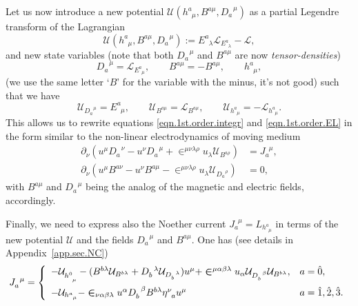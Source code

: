 \documentclass[
10pt, %
a4paper, %
oneside, %
headinclude,footinclude, %
BCOR5mm, %
]{scrartcl}
\newcommand{\tetrsymbol}{h}
\newcommand{\itetrsymbol}{\eta}
\newcommand{\itetr}[2]{\itetrsymbol^{#1}_{\phantom{#1}#2}}
\newcommand{\tetr}[2]{\tetrsymbol^{#1}_{\phantom{#1}#2}}
\newcommand{\D}[1]{\partial_{#1}} %
\newcommand{\ET}[2]{E^{#1}_{\phantom{#1}#2}}	%
\newcommand{\dT}[2]{D_{#1}^{\phantom{#1}\,#2}}	%
\newcommand{\BT}[2]{B^{#1#2}}	%
\newcommand{\bT}[2]{B^{#1#2}}	%
\newcommand{\Laghodge}{L}%
\newcommand{\LagBE}{\mathcal{L}}%
\newcommand{\LagST}{\mathcal{U}}%
\newcommand{\LCsymb}{\bm{\in}}    %
\newcommand{\NC}[2]{J^{\phantom{#1}#2}_{#1}}
\newcommand{\indalg}[1]{\hat{\mathsmaller{#1}}}
\begin{document}
Let us now introduce a new potential $ \LagST(\tetr{a}{\mu},\bT{a}{\mu},\dT{a}{\mu}) $ as a partial 
Legendre transform of the Lagrangian
\begin{equation}\label{eqn.Legandre1}
 \LagST(\tetr{a}{\mu},\bT{a}{\mu},\dT{a}{\mu}) := \ET{a}{\lambda}\LagBE_{\ET{a}{\lambda}} - \LagBE,
\end{equation}
and new state variables (note that both $ \dT{a}{\mu} $ and $ \bT{a}{\mu} $ are now 
\emph{tensor-densities})
\begin{equation}\label{eqn.Legandre2}
\dT{a}{\mu} = \LagBE_{\ET{a}{\mu}}, \qquad \bT{a}{\mu} = -\BT{a}{\mu}, \qquad 
\tetr{a}{\mu},
\end{equation}
({\color{blue}we use the same letter `$ B $' for the variable with the minus, it's not good})
such that we have
\begin{equation}\label{eqn.Legandre3}
\LagST_{\dT{a}{\mu}} = \ET{a}{\mu}, \qquad \LagST_{\bT{a}{\mu}} = \LagBE_{\BT{a}{\mu}},
\qquad \LagST_{\tetr{a}{\mu}} = - \LagBE_{\tetr{a}{\mu}}.
\end{equation}
This allows us to rewrite equations \eqref{eqn.1st.order.integr} and \eqref{eqn.1st.order.EL} in 
the form similar to the non-linear 
electrodynamics of moving medium~\cite{Obukhov2008,DPRZ2017,Hohmann2018a}
\begin{subequations}
	\begin{align}
		\D{\nu}(u^\mu\dT{a}{\nu} - u^\nu \dT{a}{\mu} + 
		\LCsymb^{\mu\nu\lambda\rho}u_\lambda 
		\LagST_{\bT{a}{\rho}})
		& =	\NC{a}{\mu},\\[2mm]
		\D{\nu}(u^\mu \bT{a}{\nu} - u^\nu \bT{a}{\mu} - 
		\LCsymb^{\mu\nu\lambda\rho}u_\lambda 
		\LagST_{\dT{a}{\rho}}) 
		& = 0,
\end{align}
\end{subequations}
with $\bT{a}{\mu}$ and $\dT{a}{\mu}$ being the analog of the magnetic and electric fields, 
accordingly.


Finally, we need to express also the Noether current $ \NC{a}{\mu} = \Laghodge_{\tetr{a}{\mu}} $ in 
terms of the 
new potential $ \LagST $ and the fields $ \dT{a}{\mu} $ and $ \bT{a}{\mu} $. One has (see details 
in Appendix~\ref{app.sec.NC})
\begin{equation}\label{eqn.J}
	\NC{a}{\mu} = \left\{
	\begin{array}{ll}
	-\LagST_{\tetr{\indalg{0}}{\mu}} 
	- (\bT{b}{\lambda} \LagST_{\bT{b}{\lambda}} 
	+ \dT{b}{\lambda} \LagST_{\dT{b}{\lambda}} )u^\mu
	+ \LCsymb^{\mu\alpha\beta\lambda} u_\alpha 
	\LagST_{\dT{b}{\beta}} \LagST_{\bT{b}{\lambda}},	& a=\hat{0},  \\[3mm] 
	-\LagST_{\tetr{a}{\mu}}	
	- \LCsymb_{\nu\alpha\beta\lambda}u^\alpha\dT{b}{\beta}\bT{b}{\lambda}\itetr{\nu}{a}u^\mu & a = 
	\hat{1},\hat{2},\hat{3}. \\ 
	\end{array} 
	\right.
\end{equation}
\end{document}
